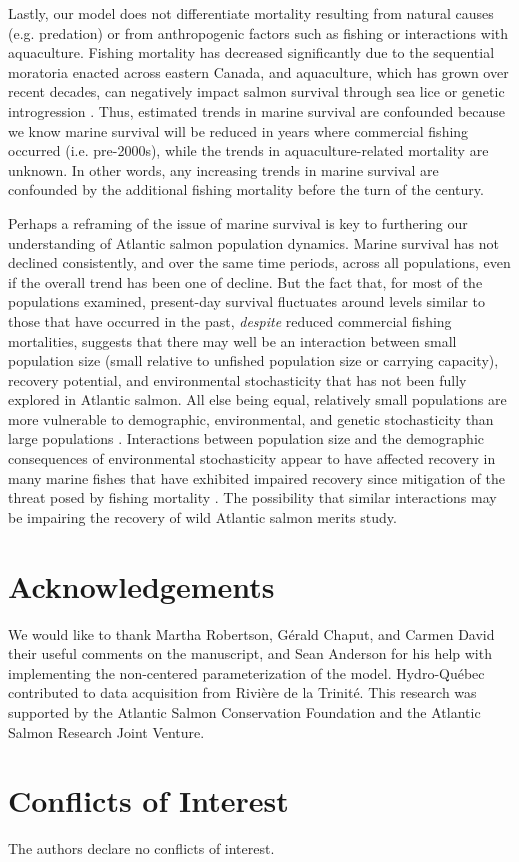 \documentclass[12pt]{article}
\begin{document}
Lastly, our model does not differentiate mortality resulting from natural
causes (e.g. predation) or from anthropogenic factors such as fishing or
interactions with aquaculture. Fishing mortality has decreased
significantly due to the sequential moratoria enacted across eastern Canada, and
aquaculture, which has grown over recent decades, can negatively impact salmon survival through sea lice
\citep{Shephard2020,Bohn2020} or genetic introgression \citep{Glover2017,Vollset2020}.
Thus, estimated trends in marine survival are confounded because we know marine
survival will be reduced in years where commercial fishing occurred (i.e.
pre-2000s), while the trends in aquaculture-related mortality are unknown.
In other words, any increasing trends in marine survival are confounded by the additional
fishing mortality before the turn of the century.

Perhaps a reframing of the issue of marine survival is key to furthering our
understanding of Atlantic salmon population dynamics. Marine survival has not
declined consistently, and over the same time periods, across all
populations, even if the overall trend has been one of decline.
But the fact that, for most of the populations examined,
present-day survival fluctuates around levels similar to those that have occurred in the past,
\emph{despite} reduced commercial fishing mortalities, suggests
that there may well be an interaction between small population size (small
relative to unfished population size or carrying capacity), recovery
potential, and environmental stochasticity that has not been fully explored in
Atlantic salmon.
All else being equal, relatively small populations are more vulnerable to
demographic, environmental, and genetic stochasticity than large populations
\citep{Lande1993, Hutchings2015}. Interactions between population size and the
demographic consequences of environmental stochasticity appear to have
affected recovery in many marine fishes that have exhibited impaired recovery
since mitigation of the threat posed by fishing mortality
\citep{Hutchings2017, Hutchings2020}. The possibility that similar
interactions may be impairing the recovery of wild Atlantic salmon merits
study.

\section*{Acknowledgements}

We would like to thank Martha Robertson, G\'{e}rald Chaput, and Carmen David
their useful comments on the manuscript, and Sean Anderson for his help with
implementing the non-centered parameterization of the model. Hydro-Québec
contributed to data acquisition from Rivière de la Trinité. This research was
supported by the Atlantic Salmon Conservation Foundation and the Atlantic
Salmon Research Joint Venture.

\section*{Conflicts of Interest}

The authors declare no conflicts of interest.



%
\end{document}
